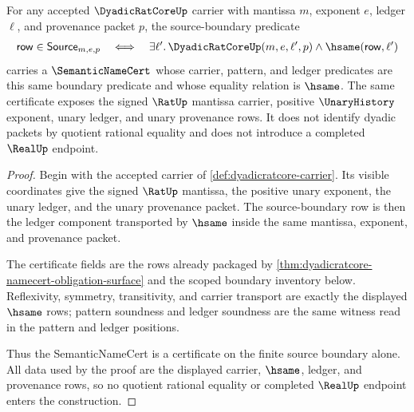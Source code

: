 \begin{theorem}
\label{thm:dyadicratcore-source-boundary-semantic-namecert}
For any accepted $\DyadicRatCoreUp$ carrier with mantissa $m$, exponent $e$,
ledger $\ell$, and provenance packet $p$, the source-boundary predicate
$$
\begin{aligned}
\mathsf{row}\in\mathsf{Source}_{m,e,p}
  \quad\Longleftrightarrow\quad
  \exists \ell'.\,
    \DyadicRatCoreUp(m,e,\ell',p)\wedge \hsame(\mathsf{row},\ell')
\end{aligned}
$$
carries a $\SemanticNameCert$ whose carrier, pattern, and ledger predicates are
this same boundary predicate and whose equality relation is $\hsame$.
The same certificate exposes the signed $\RatUp$ mantissa carrier, positive
$\UnaryHistory$ exponent, unary ledger, and unary provenance rows. It does not
identify dyadic packets by quotient rational equality and does not introduce a
completed $\RealUp$ endpoint.
\end{theorem}
\begin{proof}
Begin with the accepted carrier of \autoref{def:dyadicratcore-carrier}. Its
visible coordinates give the signed $\RatUp$ mantissa, the positive unary
exponent, the unary ledger, and the unary provenance packet. The source-boundary
row is then the ledger component transported by $\hsame$ inside the same
mantissa, exponent, and provenance packet.

The certificate fields are the rows already packaged by
\autoref{thm:dyadicratcore-namecert-obligation-surface} and the scoped boundary
inventory below. Reflexivity, symmetry, transitivity, and carrier transport are
exactly the displayed $\hsame$ rows; pattern soundness and ledger soundness are
the same witness read in the pattern and ledger positions.

Thus the SemanticNameCert is a certificate on the finite source boundary alone.
All data used by the proof are the displayed carrier, $\hsame$, ledger, and
provenance rows, so no quotient rational equality or completed $\RealUp$
endpoint enters the construction.
\end{proof}

